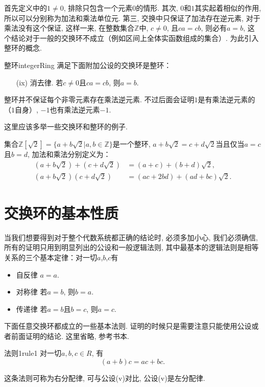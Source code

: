 首先定义中的$1 \neq 0$, 排除只包含一个元素$0$的情形. 其次, $0$和$1$其实起着相似的作用, 所以可以分别称为加法和乘法单位元. 第三, 交换中只保证了加法存在逆元素, 对于乘法没有这个保证, 这样一来, 在整数集合$\mathbb{Z}$中, $c \neq 0$, 且$ca=cb$, 则必有$a=b$, 这个结论对于一般的交换环不成立（例如区间上全体实函数组成的集合）. 为此引入整环的概念. 
\begin{definition}{整环}{integerRing} 
满足下面附加公设的交换环是整环：
\begin{enumerate}
\item[(ix)] 消去律. 若$c \neq 0$且$ca=cb$, 则$a=b$.
\end{enumerate}
\end{definition}

整环并不保证每个非零元素存在乘法逆元素. 不过后面会证明$1$是有乘法逆元素的（$1$自身）, $-1$也有乘法逆元素$-1$. 

这里应该多举一些交换环和整环的例子. 

集合$\mathbb{Z}[\sqrt{2}] = \{a+b\sqrt{2} | a,b \in \mathbb{Z}\}$是一个整环, $a+b\sqrt{2}=c+d\sqrt{2}$当且仅当$a=c$且$b=d$, 加法和乘法分别定义为：
\[
\begin{aligned}
(a + b\sqrt{2}) + (c + d\sqrt{2}) &= (a+c) + (b+d)\sqrt{2}, \\
(a + b\sqrt{2})(c + d\sqrt{2})&=(ac+2bd)+(ad+bc)\sqrt{2}.
\end{aligned}
\]


\section{交换环的基本性质}\label{subsection0010102}
当我们想要得到对于整个代数系统都正确的结论时, 必须多加小心, 我们必须确信, 所有的证明只用到明显列出的公设和一般逻辑法则, 其中最基本的逻辑法则是相等关系的三个基本定律：对一切$a$,$b$,$c$有
\begin{itemize}
\item 自反律 $a=a$.
\item 对称律 若$a=b$, 则$b=a$.
\item 传递律 若$a=b$且$b=c$, 则$a=c$.
\end{itemize}

下面任意交换环都成立的一些基本法则.  证明的时候只是需要注意只能使用公设或者前面证明的结论. 这里省略, 参考书本. 

\begin{corollary}{法则1}{rule1}
对一切$a,b,c \in R$, 有
\[
(a+b)c = ac + bc.
\]
\end{corollary}

这条法则可称为右分配律, 可与公设(v)对比, 公设(v)是左分配律. 

